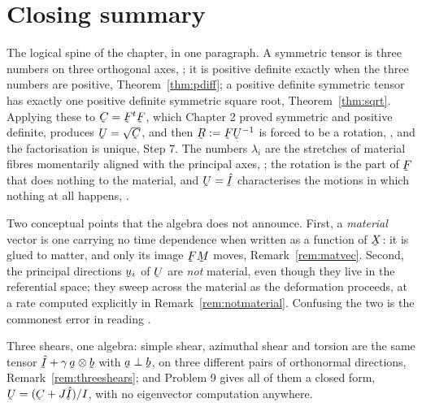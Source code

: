 \section*{Closing summary}

\noindent
The logical spine of the chapter, in one paragraph. A symmetric tensor is
three numbers on three orthogonal axes, ; it is positive definite
exactly when the three numbers are positive, Theorem~\ref{thm:pdiff}; a
positive definite symmetric tensor has exactly one positive definite
symmetric square root, Theorem~\ref{thm:sqrt}. Applying these to
$\bC=\bF^{t}\bF$, which Chapter 2 proved symmetric and positive definite,
produces $\bU=\sqrt{\bC}$, and then $\bR:=\bF\bU^{-1}$ is forced to be a
rotation, , and the factorisation is unique, Step 7. The numbers
$\lambda_{i}$ are the stretches of material fibres momentarily aligned
with the principal axes, ; the rotation is the part of $\bF$ that
does nothing to the material, and $\bU=\hI$ characterises the motions in
which nothing at all happens, .

\medskip\noindent
Two conceptual points that the algebra does not announce. First, a
\emph{material} vector is one carrying no time dependence when written as
a function of $\bX$: it is glued to matter, and only its image
$\bF\bM$ moves, Remark~\ref{rem:matvec}. Second, the principal directions
$\bu_{i}$ of $\bU$ are \emph{not} material, even though they live in the
referential space; they sweep across the material as the deformation
proceeds, at a rate computed explicitly in
Remark~\ref{rem:notmaterial}. Confusing the two is the commonest error in
reading .

\medskip\noindent
Three shears, one algebra: simple shear, azimuthal shear and torsion are
the same tensor $\hI+\gamma\,\ba\otimes\bb$ with $\ba\perp\bb$, on three
different pairs of orthonormal directions,
Remark~\ref{rem:threeshears}; and Problem 9 gives all of them a closed
form, $\bU=(\bC+J\hI)/I$, with no eigenvector computation anywhere.

